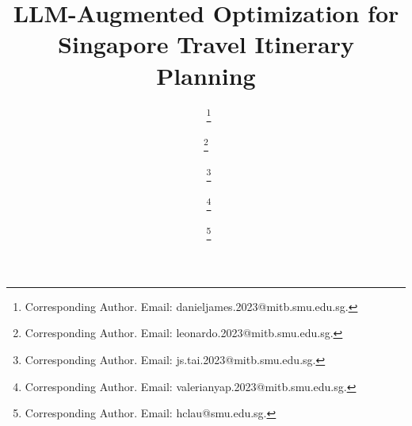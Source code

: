 \documentclass{ecai}
\begin{document}

\begin{frontmatter}




\title{LLM-Augmented Optimization for Singapore Travel Itinerary Planning}


\author[A]{~\thanks{Corresponding Author. Email: danieljames.2023@mitb.smu.edu.sg.}}

\author[A]
{\thanks{Corresponding Author. Email: leonardo.2023@mitb.smu.edu.sg.}}

\author[A]
{~\thanks{Corresponding Author. Email: js.tai.2023@mitb.smu.edu.sg.}}

\author[A]
{~\thanks{Corresponding Author. Email: valerianyap.2023@mitb.smu.edu.sg.}}

\author[A]
{~\thanks{Corresponding Author. Email: hclau@smu.edu.sg.}}

\address[A]{School of Computing and Information Systems, Singapore Management University}



\end{frontmatter}
\end{document}
